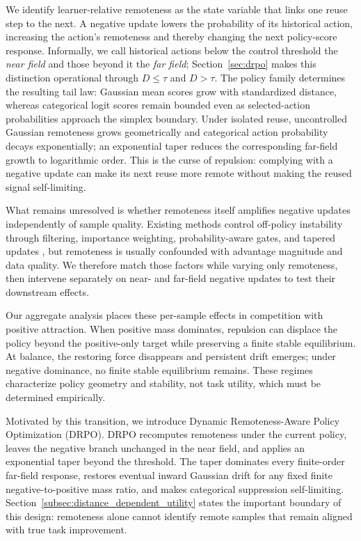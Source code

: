 \documentclass{article}
\theoremstyle{plain}
\theoremstyle{definition}
\theoremstyle{remark}
\begin{document}
We identify learner-relative remoteness as the state variable that links one
reuse step to the next. A negative update lowers the probability of its
historical action, increasing the action's remoteness and thereby changing the
next policy-score response. Informally, we call historical actions below the
control threshold the \emph{near field} and those beyond it the \emph{far
field}; Section~\ref{sec:drpo} makes this distinction operational through
\(D\leq\tau\) and \(D>\tau\). The policy family determines the resulting tail
law: Gaussian mean scores grow with standardized distance, whereas categorical
logit scores remain bounded even as selected-action probabilities approach the
simplex boundary. Under isolated reuse, uncontrolled Gaussian remoteness grows
geometrically and categorical action probability decays exponentially; an
exponential taper reduces the corresponding far-field growth to logarithmic
order. This is the curse of repulsion: complying with a negative update can
make its next reuse more remote without making the reused signal self-limiting.

What remains unresolved is whether remoteness itself amplifies negative
updates independently of sample quality. Existing methods control off-policy
instability through filtering, importance weighting, probability-aware gates,
and tapered updates
\citep{novati2019remember,fakoor2020p3o,peng2019advantage,
schulman2017proximal,fujimoto2019off,kumar2020conservative,
arnal2025asymmetric,leroux2025tapered}, but remoteness is usually confounded
with advantage magnitude and data quality. We therefore match those factors
while varying only remoteness, then intervene separately on near- and far-field
negative updates to test their downstream effects.

Our aggregate analysis places these per-sample effects in competition with
positive attraction. When positive mass dominates, repulsion can displace the
policy beyond the positive-only target while preserving a finite stable
equilibrium. At balance, the restoring force disappears and persistent drift
emerges; under negative dominance, no finite stable equilibrium remains.
These regimes characterize policy geometry and stability, not task utility,
which must be determined empirically.

Motivated by this transition, we introduce Dynamic Remoteness-Aware Policy
Optimization (DRPO). DRPO recomputes remoteness under the current policy,
leaves the negative branch unchanged in the near field, and applies an
exponential taper beyond the threshold. The taper dominates every finite-order
far-field response, restores eventual inward Gaussian drift for any fixed
finite negative-to-positive mass ratio, and makes categorical suppression
self-limiting. Section~\ref{subsec:distance_dependent_utility} states the important
boundary of this design: remoteness alone cannot identify remote samples that
remain aligned with true task improvement.
\end{document}
